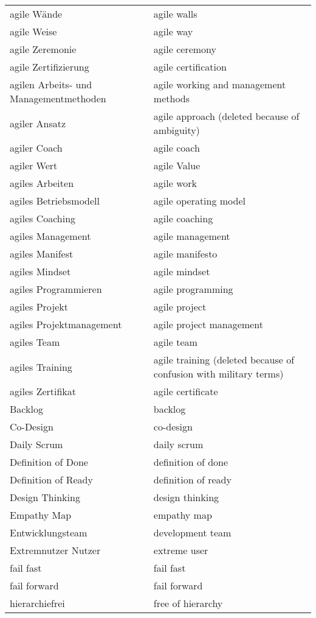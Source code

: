 \begin{spacing}{.5}
\begin{longtable}{ p{} p{}}
    agile Wände & agile walls \\
    agile Weise & agile way \\
    agile Zeremonie & agile ceremony \\
    agile Zertifizierung & agile certification \\
    agilen Arbeits- und Managementmethoden & agile working and management methods \\
    agiler Ansatz & agile approach (deleted because of ambiguity) \\
    agiler Coach & agile coach \\
    agiler Wert & agile Value \\
    agiles Arbeiten & agile work \\
    agiles Betriebsmodell & agile operating model \\
    agiles Coaching & agile coaching \\
    agiles Management & agile management \\
    agiles Manifest & agile manifesto \\
    agiles Mindset & agile mindset \\
    agiles Programmieren & agile programming \\
    agiles Projekt & agile project \\
    agiles Projektmanagement & agile project management \\
    agiles Team & agile team \\
    agiles Training & agile training (deleted because of confusion with military terms) \\
    agiles Zertifikat & agile certificate \\
    Backlog & backlog \\
    Co-Design & co-design \\
    Daily Scrum & daily scrum \\
    Definition of Done & definition of done \\
    Definition of Ready & definition of ready \\
    Design Thinking & design thinking \\
    Empathy Map & empathy map \\
    Entwicklungsteam & development team \\
    Extremnutzer Nutzer & extreme user \\
    fail fast & fail fast \\
    fail forward & fail forward \\
    hierarchiefrei & free of hierarchy \\

\end{longtable}
\end{spacing}
